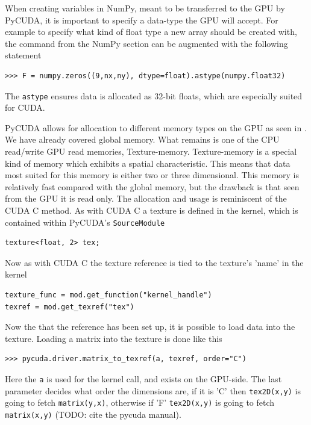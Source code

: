 When creating variables in NumPy, meant to be transferred to the GPU by PyCUDA, it is important to specify a data-type the GPU will accept. For example to specify what kind of float type a new array should be created with, the command from the NumPy section can be augmented with the following statement

\begin{verbatim}
>>> F = numpy.zeros((9,nx,ny), dtype=float).astype(numpy.float32)
\end{verbatim}

The \texttt{astype} ensures data is allocated as 32-bit floats, which are especially suited for CUDA.

PyCUDA allows for allocation to different memory types on the GPU as seen in . We have already covered global memory. What remains is one of the CPU read/write GPU read memories, Texture-memory. Texture-memory is a special kind of memory which exhibits a spatial characteristic. This means that data most suited for this memory is either two or three dimensional. This memory is relatively fast compared with the global memory, but the drawback is that seen from the GPU it is read only. The allocation and usage is reminiscent of the CUDA C method. As with CUDA C a texture is defined in the kernel, which is contained within PyCUDA's \texttt{SourceModule}

\begin{verbatim}
texture<float, 2> tex;
\end{verbatim}

Now as with CUDA C the texture reference is tied to the texture's 'name' in the kernel

\begin{verbatim}
texture_func = mod.get_function("kernel_handle")
texref = mod.get_texref("tex")
\end{verbatim}

Now the that the reference has been set up, it is possible to load data into the texture. Loading a matrix into the texture is done like this

\begin{verbatim}
>>> pycuda.driver.matrix_to_texref(a, texref, order="C")
\end{verbatim}

Here the \texttt{a} is used for the kernel call, and exists on the GPU-side. The last parameter decides what order the dimensions are, if it is 'C' then \texttt{tex2D(x,y)} is going to fetch \texttt{matrix(y,x)}, otherwise if 'F' \texttt{tex2D(x,y)} is going to fetch \texttt{matrix(x,y)} (TODO: cite the pycuda manual).

